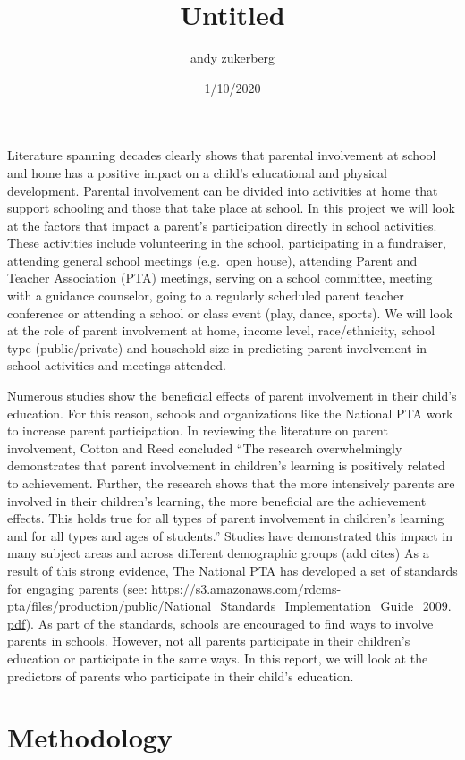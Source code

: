 \documentclass[
]{article}
\title{Untitled}
\author{andy zukerberg}
\date{1/10/2020}
\begin{document}
\maketitle

Literature spanning decades clearly shows that parental involvement at
school and home has a positive impact on a child's educational and
physical development. Parental involvement can be divided into
activities at home that support schooling and those that take place at
school. In this project we will look at the factors that impact a
parent's participation directly in school activities. These activities
include volunteering in the school, participating in a fundraiser,
attending general school meetings (e.g.~open house), attending Parent
and Teacher Association (PTA) meetings, serving on a school committee,
meeting with a guidance counselor, going to a regularly scheduled parent
teacher conference or attending a school or class event (play, dance,
sports). We will look at the role of parent involvement at home, income
level, race/ethnicity, school type (public/private) and household size
in predicting parent involvement in school activities and meetings
attended.

Numerous studies show the beneficial effects of parent involvement in
their child's education. For this reason, schools and organizations like
the National PTA work to increase parent participation. In reviewing the
literature on parent involvement, Cotton and Reed concluded ``The
research overwhelmingly demonstrates that parent involvement in
children's learning is positively related to achievement. Further, the
research shows that the more intensively parents are involved in their
children's learning, the more beneficial are the achievement effects.
This holds true for all types of parent involvement in children's
learning and for all types and ages of students.'' Studies have
demonstrated this impact in many subject areas and across different
demographic groups (add cites) As a result of this strong evidence, The
National PTA has developed a set of standards for engaging parents (see:
\url{https://s3.amazonaws.com/rdcms-pta/files/production/public/National_Standards_Implementation_Guide_2009.pdf}).
As part of the standards, schools are encouraged to find ways to involve
parents in schools. However, not all parents participate in their
children's education or participate in the same ways. In this report, we
will look at the predictors of parents who participate in their child's
education.

\hypertarget{methodology}{%
\section{\texorpdfstring{\textbf{Methodology}}{Methodology}}\label{methodology}}
\end{document}
